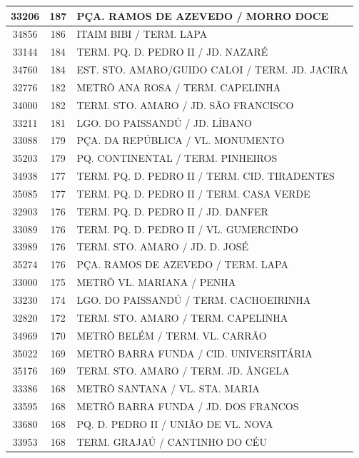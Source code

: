 \documentclass[
	12pt,				%
	oneside,			%
	a4paper,			%
	english,			%
	brazil				%
	]{abntex2ppgsi}
\begin{document}
\begin{apendicesenv}
\begin{longtable}{c|c|p{7cm}}
\hline
    33206 & 187   & PÇA. RAMOS DE AZEVEDO / MORRO DOCE \\
\hline
    34856 & 186   & ITAIM BIBI / TERM. LAPA \\
\hline
    33144 & 184   & TERM. PQ. D. PEDRO II / JD. NAZARÉ \\
\hline
    34760 & 184   & EST. STO. AMARO/GUIDO CALOI / TERM. JD. JACIRA \\
\hline
    32776 & 182   & METRÔ ANA ROSA / TERM. CAPELINHA \\
\hline
    34000 & 182   & TERM. STO. AMARO / JD. SÃO FRANCISCO \\
\hline
    33211 & 181   & LGO. DO PAISSANDÚ / JD. LÍBANO \\
\hline
    33088 & 179   & PÇA. DA REPÚBLICA / VL. MONUMENTO \\
\hline
    35203 & 179   & PQ. CONTINENTAL / TERM. PINHEIROS \\
\hline
    34938 & 177   & TERM. PQ. D. PEDRO II / TERM. CID. TIRADENTES \\
\hline
    35085 & 177   & TERM. PQ. D. PEDRO II / TERM. CASA VERDE \\
\hline
    32903 & 176   & TERM. PQ. D. PEDRO II / JD. DANFER \\
\hline
    33089 & 176   & TERM. PQ. D. PEDRO II / VL. GUMERCINDO \\
\hline
    33989 & 176   & TERM. STO. AMARO / JD. D. JOSÉ \\
\hline
    35274 & 176   & PÇA. RAMOS DE AZEVEDO / TERM. LAPA \\
\hline
    33000 & 175   & METRÔ VL. MARIANA / PENHA \\
\hline
    33230 & 174   & LGO. DO PAISSANDÚ / TERM. CACHOEIRINHA \\
\hline
    32820 & 172   & TERM. STO. AMARO / TERM. CAPELINHA \\
\hline
    34969 & 170   & METRÔ BELÉM / TERM. VL. CARRÃO \\
\hline
    35022 & 169   & METRÔ BARRA FUNDA / CID. UNIVERSITÁRIA \\
\hline
    35176 & 169   & TERM. STO. AMARO / TERM. JD. ÂNGELA \\
\hline
    33386 & 168   & METRÔ SANTANA / VL. STA. MARIA \\
\hline
    33595 & 168   & METRÔ BARRA FUNDA / JD. DOS FRANCOS \\
\hline
    33680 & 168   & PQ. D. PEDRO II / UNIÃO DE VL. NOVA \\
\hline
    33953 & 168   & TERM. GRAJAÚ / CANTINHO DO CÉU \\

\end{longtable}
\end{apendicesenv}
\end{document}
